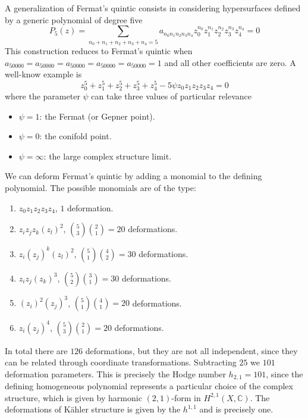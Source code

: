 A generalization of Fermat's quintic consists in considering hypersurfaces defined by a generic polynomial of degree five
\begin{equation}
  P_5(z)=\sum_{n_0+n_1+n_2+n_3+n_4=5} a_{n_0 n_1 n_2 n_3 n_4} z_0^{n_0}z_1^{n_1}z_2^{n_2}z_3^{n_3}z_4^{n_4}=0
\end{equation}
This construction reduces to Fermat's quintic when $a_{50000}=a_{50000}=a_{50000}=a_{50000}=a_{50000}=1$ and all other coefficients are zero.
A well-know example is
\begin{equation}
  z_0^5+z_1^5+z_2^5+z_3^5+z_4^5- 5\psi z_0z_1z_2z_3z_4=0
\end{equation}
 where the parameter $\psi$ can take three values of particular relevance
\begin{itemize}
  \item $\psi=1$: the Fermat (or Gepner point).
  \item $\psi=0$: the conifold point.
  \item $\psi=\infty$: the large complex structure limit.
\end{itemize}

We can deform Fermat's quintic by adding a monomial to the defining polynomial.
The possible monomials are of the type:
\begin{enumerate}
  \item $z_0z_1z_2z_3z_4$, $1$ deformation.
  \item $z_i z_j z_k(z_l)^2$, ${5}\choose{3}$${2}\choose{1}$$=20$ deformations. 
  \item $z_i(z_j)^k(z_l)^2$, ${5}\choose{1}$${4}\choose{2}$$=30$ deformations.
  \item $z_i z_j(z_k)^3$, ${5}\choose{2}$${3}\choose{1}$$=30$ deformations.
  \item $(z_i)^2(z_j)^3$, ${5}\choose{1}$${4}\choose{1}$$=20$ deformations.
  \item $z_i(z_j)^4$, ${5}\choose{3}$${2}\choose{1}$$=20$ deformations.
\end{enumerate}
In total there are $126$ deformations, but they are not all independent, since they 
can be related through coordinate transformations.
Subtracting  $25$ we $101$ deformation parameters.
This is precisely the Hodge number $h_{2,1}=101$, since the defining homogeneous polynomial  
represents a particular choice of the complex structure, which is given by 
harmonic $(2,1)$-form in $H^{2,1}(X,\mathbb C)$.
The deformations of Kähler structure is given by the $h^{1,1}$ and is precisely one.

